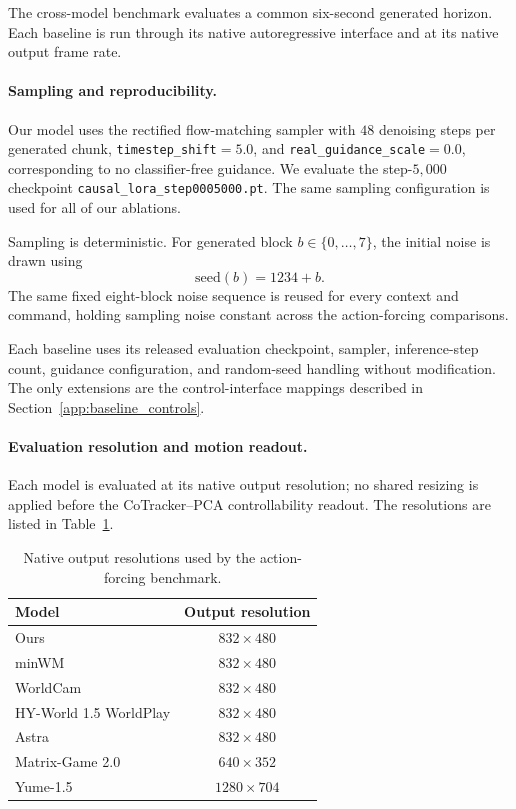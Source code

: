 \documentclass[letterpaper]{article} %
\begin{document}
The cross-model benchmark evaluates a common six-second generated horizon.
Each baseline is run through its native autoregressive interface and at its
native output frame rate.

\paragraph{Sampling and reproducibility.}
Our model uses the rectified flow-matching sampler with $48$ denoising steps
per generated chunk, \texttt{timestep\_shift}$=5.0$, and
\texttt{real\_guidance\_scale}$=0.0$, corresponding to no classifier-free
guidance. We evaluate the step-$5{,}000$ checkpoint
\texttt{causal\_lora\_step0005000.pt}. The same sampling configuration is used
for all of our ablations.

Sampling is deterministic. For generated block
$b\in\{0,\ldots,7\}$, the initial noise is drawn using
\[
\mathrm{seed}(b)=1234+b.
\]
The same fixed eight-block noise sequence is reused for every context and
command, holding sampling noise constant across the action-forcing
comparisons.

Each baseline uses its released evaluation checkpoint, sampler, inference-step
count, guidance configuration, and random-seed handling without modification.
The only extensions are the control-interface mappings described in
Section~\ref{app:baseline_controls}.

\paragraph{Evaluation resolution and motion readout.}
Each model is evaluated at its native output resolution; no shared resizing is
applied before the CoTracker--PCA controllability readout. The resolutions are
listed in Table~\ref{tab:action_forcing_resolutions}.

\begin{table}[t]
\centering
\small
\caption{Native output resolutions used by the action-forcing benchmark.}
\label{tab:action_forcing_resolutions}
\begin{tabular}{lc}
\toprule
Model & Output resolution \\
\midrule
Ours & $832\times480$ \\
minWM & $832\times480$ \\
WorldCam & $832\times480$ \\
HY-World 1.5 WorldPlay & $832\times480$ \\
Astra & $832\times480$ \\
Matrix-Game 2.0 & $640\times352$ \\
Yume-1.5 & $1280\times704$ \\
\bottomrule
\end{tabular}
\end{table}
\end{document}
